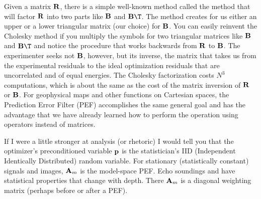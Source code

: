 \par
Given a matrix $\bold R$,
there is a simple well-known method
called the  method that will factor $\bold R$
into two parts like $\bold B$ and $\bold B\T$.
The method creates for us either an upper or a lower triangular
matrix (our choice) for $\bold B$.
You can easily reinvent the Cholesky method
if you multiply
the symbols for two triangular matrices like
$\bold B$ and $\bold B\T$ and notice the procedure that
works backwards from $\bold R$ to $\bold B$.
The experimenter seeks not $\bold B$, however, but its inverse,
the matrix that takes us from the experimental residuals
to the ideal optimization residuals
that are uncorrelated and of equal energies.
The Cholesky factorization costs $N^3$ computations,
which is about the same as the cost of the matrix inversion
of $\bold R$ or $\bold B$.
For geophysical maps and other functions on Cartesian spaces,
the Prediction Error Filter (PEF) accomplishes the same
general goal and has the advantage that we have already
learned how to perform the operation using operators
instead of matrices.
\par
{}
%
\par
If I were a little stronger at analysis (or rhetoric)
I would tell you that
the optimizer's preconditioned variable $\bold p$
is the statistician's IID (Independent Identically Distributed) random variable.
For stationary (statistically constant) signals and images,
$\bold A_m$
is the model-space PEF.
Echo soundings and
have statistical properties
that change with depth.
There $\bold A_m$
is a diagonal weighting matrix
(perhaps before or after a PEF).



